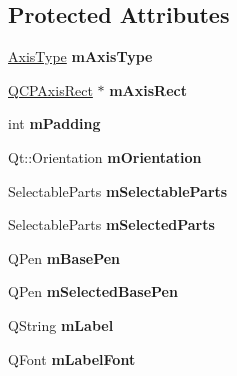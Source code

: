 \subsection*{Protected Attributes}
\begin{DoxyCompactItemize}
\item 
\mbox{\label{class_q_c_p_axis_ae704bf9f2c2b026f08dd4ccad79c616e}} 
\mbox{\hyperlink{class_q_c_p_axis_ae2bcc1728b382f10f064612b368bc18a}{Axis\+Type}} {\bfseries m\+Axis\+Type}
\item 
\mbox{\label{class_q_c_p_axis_a6f150b65a202f32936997960e331dfcb}} 
\mbox{\hyperlink{class_q_c_p_axis_rect}{Q\+C\+P\+Axis\+Rect}} $\ast$ {\bfseries m\+Axis\+Rect}
\item 
\mbox{\label{class_q_c_p_axis_a52a805a4f03231210e0880db7f77e098}} 
int {\bfseries m\+Padding}
\item 
\mbox{\label{class_q_c_p_axis_a048e1792fa86f4f86df55200b3f0be36}} 
Qt\+::\+Orientation {\bfseries m\+Orientation}
\item 
\mbox{\label{class_q_c_p_axis_ab9042d8a095998f27a28b39411d8b9c3}} 
Selectable\+Parts {\bfseries m\+Selectable\+Parts}
\item 
\mbox{\label{class_q_c_p_axis_a8f1eb0abfe2ae64652aa46b360e841e4}} 
Selectable\+Parts {\bfseries m\+Selected\+Parts}
\item 
\mbox{\label{class_q_c_p_axis_ad6b4a0aee9558fb35529e960b8fef72d}} 
Q\+Pen {\bfseries m\+Base\+Pen}
\item 
\mbox{\label{class_q_c_p_axis_a80baa4e3c16f9b6edf3eccacd2a50fde}} 
Q\+Pen {\bfseries m\+Selected\+Base\+Pen}
\item 
\mbox{\label{class_q_c_p_axis_ae8001dbdfc47685c1cf7b98b044460e6}} 
Q\+String {\bfseries m\+Label}
\item 
\mbox{\label{class_q_c_p_axis_a37442d470e30e19b81ecaf979a34d046}} 
Q\+Font {\bfseries m\+Label\+Font}
\item 

\end{DoxyCompactItemize}
